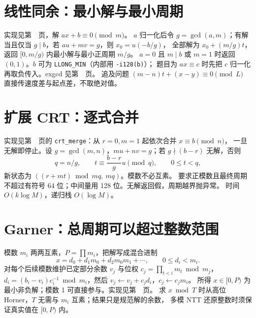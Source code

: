 \section{线性同余：最小解与最小周期}\label{knowledge-linear-congruence}
实现见第~\pageref{compact-linear_congruence}~页，解 $ax+b\equiv0\pmod m$。
$a$ 归一化后令 $g=\gcd(a,m)$；有解当且仅当 $g\mid b$，若 $au+mv=g$，则 $x_0=u(-b/g)$，
全部解为 $x_0+(m/g)t$，返回 $[0,m/g)$ 内最小解与最小正周期 $m/g$。
$a=0$ 且 $m\mid b$ 或 $m=1$ 时返回 $(0,1)$。$b$ 可为 \texttt{LLONG\_MIN}（内部用 \texttt{-i128(b)}）；
题目为 $ax\equiv c$ 时先把 $c$ 归一化再取负传入。exgcd 见第~\pageref{knowledge-diophantine-bounds}~页。
追及问题 $(m-n)t+(x-y)\equiv0\pmod L$ 直接传速度差与起点差，不取绝对值。

\section{扩展 CRT：逐式合并}\label{knowledge-excrt}
实现见第~\pageref{compact-crt_merge}~页的 \texttt{crt\_merge}：从 $r=0,m=1$ 起依次合并 $x\equiv b\pmod n$，
一旦无解即停止。设 $g=\gcd(m,n)$，$mu+nv=g$；若 $g\nmid(b-r)$ 无解，否则
\[
q=n/g,\qquad t\equiv\frac{b-r}{g}u\pmod q,\qquad 0\le t<q,
\]
新状态为 $((r+mt)\bmod mq,\ mq)$。模数不必互素。
要求正模数且最终周期不超过有符号 64 位；中间量用 128 位。无解返回假，周期越界抛异常。
时间 $O(k\log M)$，递归栈 $O(\log M)$。

\section{Garner：总周期可以超过整数范围}\label{knowledge-garner}
模数 $m_i$ 两两互素，$P=\prod m_i$，把解写成混合进制
\[
x=d_0+d_1m_0+d_2m_0m_1+\cdots,\qquad 0\le d_i<m_i.
\]
对每个后续模数维护已定部分余数 $v_j$ 与位权 $c_j=\prod_{t<i}m_t\bmod m_j$，
$d_i=(b_i-v_i)c_i^{-1}\bmod m_i$，然后 $v_j\gets v_j+c_jd_i$，$c_j\gets c_jm_i$。
所得 $x\in[0,P)$ 为最小非负解；模数 1 可直接参与。实现见第~\pageref{compact-garner}~页。
求 $x\bmod T$ 时从高位 Horner，$T$ 无需与 $m_i$ 互素；结果只是规范解的余数，
多模 NTT 还原整数时须保证真实值在 $[0,P)$ 内。
